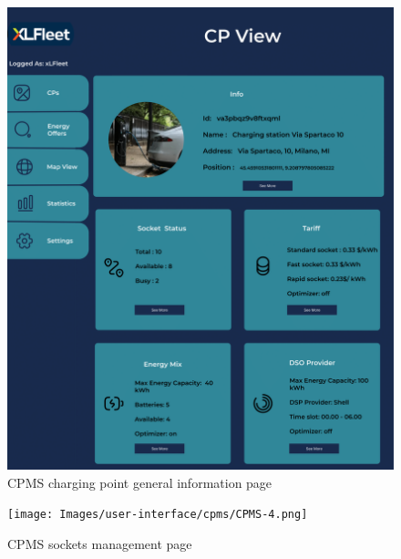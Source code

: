 \documentclass{Configuration_Files/PoliMi3i_thesis}
\begin{document}
\begin{figure}[H]
    \centering
    \includegraphics[width=1\textwidth]{Images/user-interface/cpms/CPMS-5.png}
    \caption{CPMS charging point general information page}
\end{figure}

\begin{figure}[H]
    \centering
    \texttt{[image: Images/user-interface/cpms/CPMS-4.png]}
    \caption{CPMS sockets management page}
\end{figure}
\end{document}
